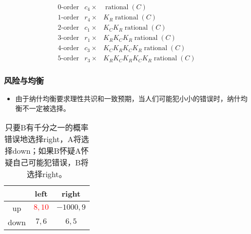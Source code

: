 \documentclass[UTF8,11pt,colorlinks,compress,openany]{beamer}%
\begin{document}
\begin{frame}
\[
\begin{array}{lll}
	\text{0-order} & c_4\times & \operatorname{rational}(C)\\
	\text{1-order} & r_4\times & K_R \operatorname{rational}(C)\\
	\text{2-order} & c_1\times & K_CK_R \operatorname{rational}(C)\\
	\text{3-order} & r_1\times & K_RK_CK_R \operatorname{rational}(C)\\
	\text{4-order} & c_3\times & K_CK_RK_CK_R \operatorname{rational}(C)\\
	\text{5-order} & r_3\times & K_RK_CK_RK_CK_R \operatorname{rational}(C)
\end{array}
\]
\end{frame}

\begin{frame}\frametitle{风险与均衡}
\begin{itemize}
	\item 由于纳什均衡要求理性共识和一致预期，当人们可能犯小小的错误时，纳什均衡不一定被选择。
\end{itemize}
\begin{table}
\abovetabulinesep=1mm
\belowtabulinesep=1mm
\begin{tabu}{c|c|c}
\hline
 & left & right \\
\hline
up & \textcolor{red}{$8,10$} & $-1000,9$ \\
down & $7,6$ & $6,5$ \\
\hline
\end{tabu}\caption{只要B有千分之一的概率错误地选择right，A将选择down；如果B怀疑A怀疑自己可能犯错误，B将选择right。}
\end{table}
\end{frame}
\end{document}
